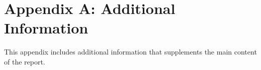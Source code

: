 \section{Appendix A: Additional Information}
\label{appendix:A}
This appendix includes additional information that supplements the main content of the report.